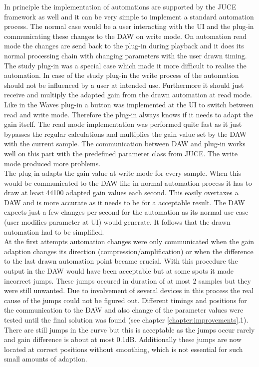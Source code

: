 In principle the implementation of automations are supported by the JUCE framework as well and it can be very simple to implement a standard automation process. The normal case would be a user interacting with the UI and the plug-in communicating these changes to the DAW on write mode. On automation read mode the changes are send back to the plug-in during playback and it does its normal processing chain with changing parameters with the user drawn timing. The study plug-in was a special case which made it more difficult to realise the automation. In case of the study plug-in the write process of the automation should not be influenced by a user at intended use. Furthermore it should just receive and multiply the adapted gain from the drawn automation at read mode.\\
Like in the Waves plug-in a button was implemented at the UI to switch between read and write mode. Therefore the plug-in always knows if it needs to adapt the gain itself. The read mode implementation was performed quite fast as it just bypasses the regular calculations and multiplies the gain value set by the DAW with the current sample. The communication between DAW and plug-in works well on this part with the predefined parameter class from JUCE. The write mode produced more problems.\\
The plug-in adapts the gain value at write mode for every sample. When this would be communicated to the DAW like in normal automation process it has to draw at least 44100 adapted gain values each second. This easily overtaxes a DAW and is more accurate as it needs to be for a acceptable result. The DAW expects just a few changes per second for the automation as its normal use case (user modifies parameter at UI) would generate. It follows that the drawn automation had to be simplified.\\
At the first attempts automation changes were only communicated when the gain adaption changes its direction (compression/amplification) or when the difference to the last drawn automation point became crucial. With this procedure the output in the DAW would have been acceptable but at some spots it made incorrect jumps. These jumps occured in duration of at most 2 samples but they were still unwanted. Due to involvement of several devices in this process the real cause of the jumps could not be figured out. Different timings and positions for the communication to the DAW and also change of the parameter values were tested until the final solution was found (see chapter \ref{chapter:improvements}.1).\\
There are still jumps in the curve but this is acceptable as the jumps occur rarely and gain difference is about at most 0.1dB. Additionally these jumps are now located at correct positions without smoothing, which is not essential for such small amounts of adaption.\\

